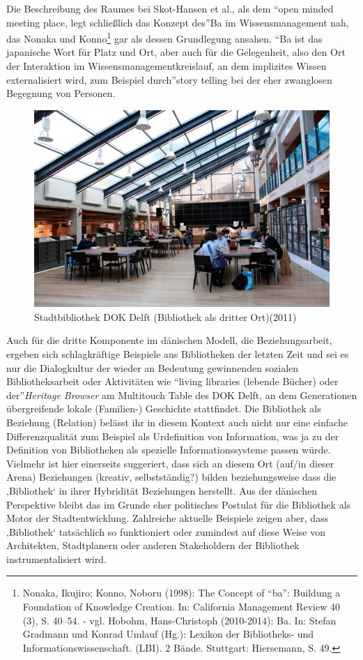 Die Beschreibung des Raumes bei Skot-Hansen et al., als dem
\enquote{open minded meeting place, legt schließlich das Konzept des}Ba
im Wissensmanagement nah, das Nonaka und Konno\footnote{Nonaka, Ikujiro;
  Konno, Noboru (1998): The Concept of \enquote{ba}: Buildung a
  Foundation of Knowledge Creation. In: California Management Review 40
  (3), S. 40--54. - vgl. Hobohm, Hans-Christoph (2010-2014): Ba. In:
  Stefan Gradmann und Konrad Umlauf (Hg.): Lexikon der Bibliotheks- und
  Informationswissenschaft. (LBI). 2 Bände. Stuttgart: Hiersemann, S.
  49.} gar als dessen Grundlegung ansahen. \enquote{Ba ist das
japanische Wort für Platz und Ort, aber auch für die Gelegenheit, also
den Ort der Interaktion im Wissensmanagementkreislauf, an dem implizites
Wissen externalisiert wird, zum Beispiel durch}story telling bei der
eher zwanglosen Begegnung von Personen.

\begin{figure}[htbp]
\centering
\includegraphics{img/hobohm-3.jpg}
\caption{Stadtbibliothek DOK Delft (Bibliothek als dritter
Ort)(2011)}
\end{figure}

Auch für die dritte Komponente im dänischen Modell, die
Beziehungsarbeit, ergeben sich schlagkräftige Beispiele aus Bibliotheken
der letzten Zeit und sei es nur die Dialogkultur der wieder an Bedeutung
gewinnenden sozialen Bibliotheksarbeit oder Aktivitäten wie
\enquote{living libraries (lebende Bücher) oder der}\emph{Heritage
Browser} am Multitouch Table des DOK Delft, an dem Generationen
übergreifende lokale (Familien-) Geschichte stattfindet. Die Bibliothek
als Beziehung (Relation) belässt ihr in diesem Kontext auch nicht nur
eine einfache Differenzqualität zum Beispiel als Urdefinition von
Information, was ja zu der Definition von Bibliotheken als spezielle
Informationssysteme passen würde. Vielmehr ist hier einerseits
suggeriert, dass sich an diesem Ort (auf/in dieser Arena) Beziehungen
(kreativ, selbstständig?) bilden beziehungsweise dass die ‚Bibliothek`
in ihrer Hybridität Beziehungen herstellt. Aus der dänischen Perspektive
bleibt das im Grunde eher politisches Postulat für die Bibliothek als
Motor der Stadtentwicklung. Zahlreiche aktuelle Beispiele zeigen aber,
dass ‚Bibliothek` tatsächlich so funktioniert oder zumindest auf diese
Weise von Architekten, Stadtplanern oder anderen Stakeholdern der
Bibliothek instrumentalisiert wird.

